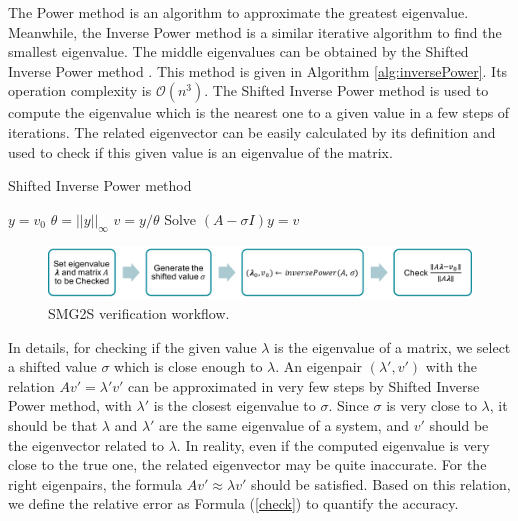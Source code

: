 The Power method is an algorithm to approximate the greatest eigenvalue. Meanwhile, the Inverse Power method is a similar iterative algorithm to find the smallest eigenvalue. The middle eigenvalues can be obtained by the Shifted Inverse Power method \cite{hernandez2005single}.  This method is given in Algorithm \ref{alg:inversePower}. Its operation complexity is $\mathcal{O}(n^3)$. The Shifted Inverse Power method is used to compute the eigenvalue which is the nearest one to a given value in a few steps of iterations. The related eigenvector can be easily calculated by its definition and used to check if this given value is an eigenvalue of the matrix.

\begin{algorithm}[htbp]{}
	\caption{ Shifted Inverse Power method}   
	\label{alg:inversePower}   
	\begin{algorithmic}[1]
		\State $y=v_0$
		\State $\theta=||y||_\infty$
		\State $v=y/\theta$
		\State Solve $(A-\sigma I)y=v$
		\EndFor 
		\EndFunction
	\end{algorithmic}  
\end{algorithm}

\begin{figure}[htbp]
	\centering
	\includegraphics[width=6.2in]{fig/smg2s-check.pdf}
	\caption{SMG2S verification workflow.}
	\label{smg2s-check}
\end{figure}

In details, for checking if the given value $\lambda$ is the eigenvalue of a matrix, we select a shifted value $\sigma$ which is close enough to $\lambda$. An eigenpair $(\lambda', v')$ with the relation $Av'=\lambda' v'$ can be approximated in very few steps by Shifted Inverse Power method, with $\lambda'$ is the closest eigenvalue to $\sigma$. Since $\sigma$ is very close to $\lambda$, it should be that $\lambda$ and $\lambda'$ are the same eigenvalue of a system, and $v'$ should be the eigenvector related to $\lambda$. In reality, even if the computed eigenvalue is very close to the true one, the related eigenvector may be quite inaccurate. For the right eigenpairs, the formula $Av'\approx\lambda v'$ should be satisfied. Based on this relation, we define the relative error as Formula (\ref{check}) to quantify the accuracy. 

